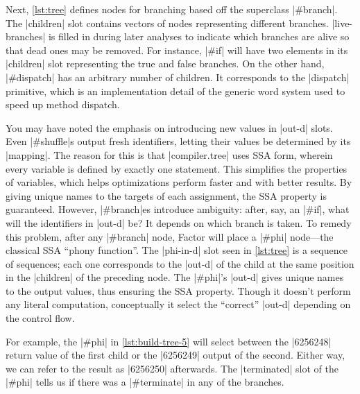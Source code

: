Next, \vref{lst:tree} defines nodes for branching based off the superclass
\factor|#branch|.  The \factor|children| slot contains vectors of nodes
representing different branches.  \factor|live-branches| is filled in during
later analyses to indicate which branches are alive so that dead ones may be
removed.  For instance, \factor|#if| will have two elements in its
\factor|children| slot representing the true and false branches.  On the other
hand, \factor|#dispatch| has an arbitrary number of children.  It corresponds
to the \factor|dispatch| primitive, which is an implementation detail of the
generic word system used to speed up method dispatch.


You may have noted the emphasis on introducing new values in \factor|out-d|
slots.  Even \factor|#shuffle|s output fresh identifiers, letting their values
be determined by its \factor|mapping|.  The reason for this is that
\factor|compiler.tree| uses \gls{SSA} form, wherein every variable is defined
by exactly one statement.  This simplifies the properties of variables, which
helps optimizations perform faster and with better results.  By giving unique
names to the targets of each assignment, the \gls{SSA} property is guaranteed.
However, \factor|#branch|es introduce ambiguity: after, say, an \factor|#if|,
what will the identifiers in \factor|out-d| be?  It depends on which branch is
taken.  To remedy this problem, after any \factor|#branch| node, Factor will
place a \factor|#phi| node---the classical \gls{SSA} ``phony function''.  The
\factor|phi-in-d| slot seen in \vref{lst:tree} is a sequence of sequences; each
one corresponds to the \factor|out-d| of the child at the same position in the
\factor|children| of the preceding node.  The \factor|#phi|'s \factor|out-d|
gives unique names to the output values, thus ensuring the \gls{SSA} property.
Though it doesn't perform any literal computation, conceptually it select the
``correct'' \factor|out-d| depending on the control flow.


For example, the \factor|#phi| in \vref{lst:build-tree-5} will select between
the
%
\factor|6256248|
%
return value of the first child or the 
%
\factor|6256249|
%
output of the second.  Either way, we can refer to the result as
\factor|6256250| afterwards.  The \factor|terminated| slot of the \factor|#phi|
tells us if there was a \factor|#terminate| in any of the branches.

